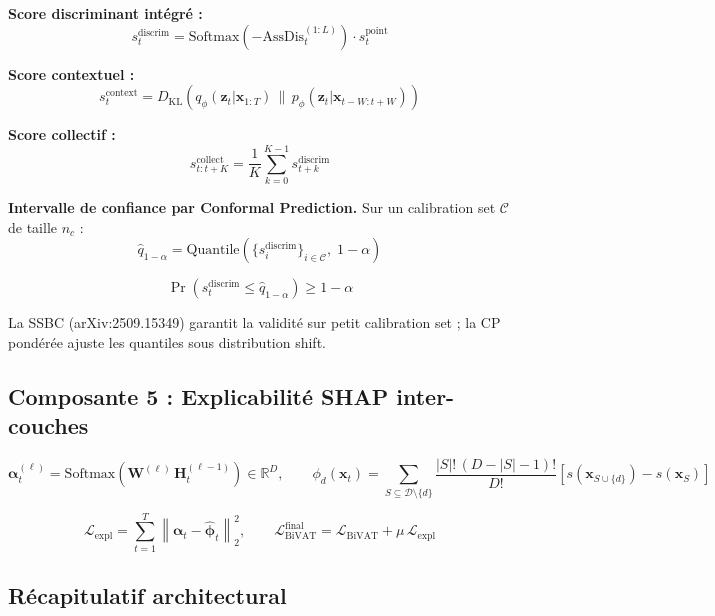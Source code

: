 \documentclass[12pt,a4paper]{article}
\begin{document}
\textbf{Score discriminant intégré :}
$$s^{\mathrm{discrim}}_t =
\mathrm{Softmax}\!\left(-\mathrm{AssDis}^{(1:L)}_t\right) \cdot
s^{\mathrm{point}}_t$$

\textbf{Score contextuel :}
$$s^{\mathrm{context}}_t = D_{\mathrm{KL}}\!\left(
q_\phi(\mathbf{z}_t|\mathbf{x}_{1:T})\,\|
\,p_\phi(\mathbf{z}_t|\mathbf{x}_{t-W:t+W})\right)$$

\textbf{Score collectif :}
$$s^{\mathrm{collect}}_{t:t+K} = \frac{1}{K}\sum_{k=0}^{K-1}
s^{\mathrm{discrim}}_{t+k}$$

\textbf{Intervalle de confiance par Conformal Prediction.} Sur un calibration
set $\mathcal{C}$ de taille $n_c$ :
$$\hat{q}_{1-\alpha} = \mathrm{Quantile}\!\left(
\{s^{\mathrm{discrim}}_i\}_{i \in \mathcal{C}},\; 1-\alpha\right)$$

$$\Pr\!\left(s^{\mathrm{discrim}}_t \leq \hat{q}_{1-\alpha}\right) \geq 1-\alpha$$

La SSBC (arXiv:2509.15349) garantit la validité sur petit calibration set ; la
CP pondérée ajuste les quantiles sous distribution shift.

\subsection{Composante 5 : Explicabilité SHAP inter-couches}

$$\boldsymbol{\alpha}^{(\ell)}_t =
\mathrm{Softmax}(\mathbf{W}^{(\ell)}\,\mathbf{H}^{(\ell-1)}_t)
\in \mathbb{R}^D, \qquad
\phi_d(\mathbf{x}_t) = \sum_{S \subseteq \mathcal{D}\setminus\{d\}}
\frac{|S|!\,(D-|S|-1)!}{D!}
\left[s(\mathbf{x}_{S\cup\{d\}}) - s(\mathbf{x}_S)\right]$$

$$\mathcal{L}_{\mathrm{expl}} = \sum_{t=1}^T
\left\|\boldsymbol{\alpha}_t - \hat{\boldsymbol{\phi}}_t\right\|_2^2, \qquad
\mathcal{L}^{\mathrm{final}}_{\mathrm{BiVAT}} =
\mathcal{L}_{\mathrm{BiVAT}} + \mu\,\mathcal{L}_{\mathrm{expl}}$$

\subsection{Récapitulatif architectural}
\end{document}
